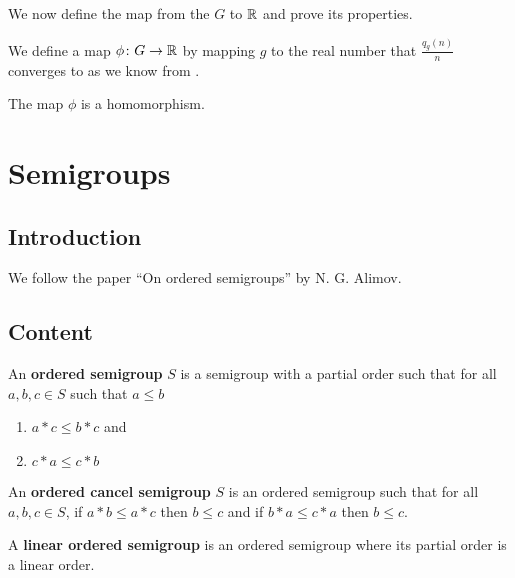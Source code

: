 We now define the map from the $G$ to $\mathbb{R}$ and prove its properties.

\begin{definition}\label{def:phi'}
    \leanok{}
    We define a map $\phi\colon G \to \mathbb{R}$ by mapping $g$
    to the real number that $\frac{q_g(n)}{n}$ converges to
    as we know from .
\end{definition}

\begin{theorem}\label{phi'_hom}
    \leanok{}
    The map $\phi$ is a homomorphism.
\end{theorem}

\chapter{Semigroups}
\section{Introduction}
We follow the paper ``On ordered semigroups'' by
N. G. Alimov.

\section{Content}

\begin{definition}\label{def:OrderedSemigroup}\leanok
An \textbf{ordered semigroup} $S$ is a semigroup with a partial order such that
for all $a,b,c\in S$ such that $a \le b$
\begin{enumerate}
    \item $a * c \le b * c$ and
    \item $c * a \le c * b$
\end{enumerate}
\end{definition}

\begin{definition}\label{def:OrderedCancelSemigroup}\leanok
{}
An \textbf{ordered cancel semigroup} $S$ is an ordered semigroup such that for all $a,b,c\in S$,
if $a * b \le a * c$ then $b \le c$ and if $b * a \le c * a$ then $b \le c$.
\end{definition}

\begin{definition}\label{def:LinearOrderedSemigroup}\leanok
{}
A \textbf{linear ordered semigroup} is an ordered semigroup where its partial order is a linear order.
\end{definition}

